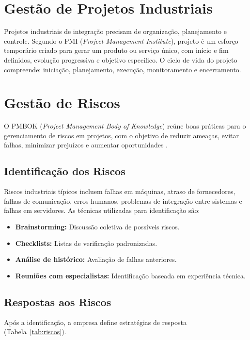 \documentclass[12pt,a4paper,oneside]{article}
\begin{document}
\section{Gestão de Projetos Industriais}

Projetos industriais de integração precisam de organização, planejamento e controle. Segundo o PMI (\textit{Project Management Institute}), projeto é um esforço temporário criado para gerar um produto ou serviço único, com início e fim definidos, evolução progressiva e objetivo específico. O ciclo de vida do projeto compreende: iniciação, planejamento, execução, monitoramento e encerramento.

\section{Gestão de Riscos}

O PMBOK (\textit{Project Management Body of Knowledge}) reúne boas práticas para o gerenciamento de riscos em projetos, com o objetivo de reduzir ameaças, evitar falhas, minimizar prejuízos e aumentar oportunidades \cite{caiçara2015}.

\subsection{Identificação dos Riscos}

Riscos industriais típicos incluem falhas em máquinas, atraso de fornecedores, falhas de comunicação, erros humanos, problemas de integração entre sistemas e falhas em servidores. As técnicas utilizadas para identificação são:

\begin{itemize}
  \item \textbf{Brainstorming:} Discussão coletiva de possíveis riscos.
  \item \textbf{Checklists:} Listas de verificação padronizadas.
  \item \textbf{Análise de histórico:} Avaliação de falhas anteriores.
  \item \textbf{Reuniões com especialistas:} Identificação baseada em experiência técnica.
\end{itemize}

\subsection{Respostas aos Riscos}

Após a identificação, a empresa define estratégias de resposta (Tabela~\ref{tab:riscos}).
\end{document}
